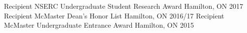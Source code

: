 \begin{cvhonors}
     \cvhonor
       {Recipient}
       {NSERC Undergraduate Student Research Award}
       {Hamilton, ON} %
       {2017}
     \cvhonor
      {Recipient}
      {McMaster Dean's Honor List}
      {Hamilton, ON}
      {2016/17}
     \cvhonor
      {Recipient}
      {McMaster Undergraduate Entrance Award}
      {Hamilton, ON}
      {2015}
\end{cvhonors}

